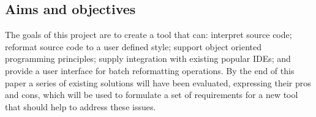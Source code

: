 \subsection{Aims and objectives}
The goals of this project are to create a tool that can: interpret source code; reformat source code to a user defined style; support object oriented programming principles; supply integration with existing popular IDEs; and provide a user interface for batch reformatting operations. By the end of this paper a series of existing solutions will have been evaluated, expressing their pros and cons, which will be used to formulate a set of requirements for a new tool that should help to address these issues.
